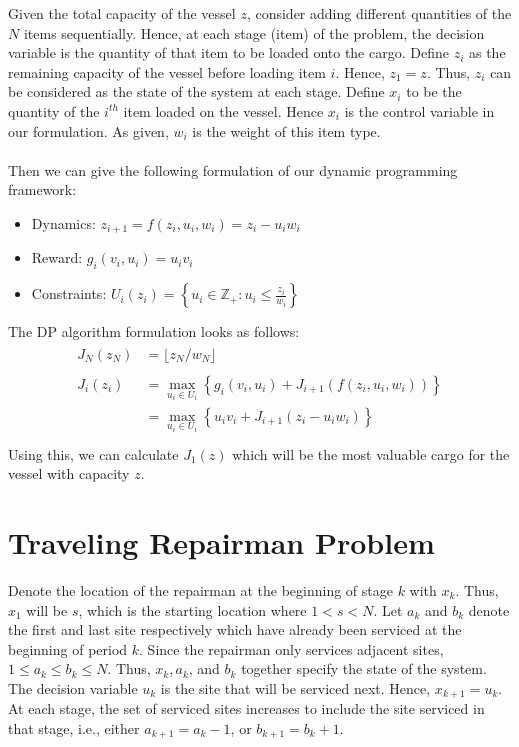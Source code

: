 \documentclass[11pt, oneside]{article}   	%
\begin{document}
Given the total capacity of the vessel $z$, consider adding different quantities of the $N$ items sequentially. Hence, at each stage (item) of the problem, the decision variable is the quantity of that item to be loaded onto the cargo. Define $z_i$ as the remaining capacity of the vessel before loading item $i$. Hence, $z_1 = z$. Thus, $z_i$ can be considered as the state of the system at each stage. Define $x_i$ to be the quantity of the $i^{th}$ item loaded on the vessel. Hence $x_i$ is the control variable in our formulation. As given, $w_i$ is the weight of this item type.\\\\
Then we can give the following formulation of our dynamic programming framework:
\begin{itemize}
\item Dynamics: $z_{i+1} = f(z_i,u_i,w_i) = z_i - u_i w_i$
\item Reward: $g_i(v_i, u_i) = u_i v_i$
\item Constraints: $U_i(z_i) = \left\{ u_i \in \mathbb{Z}_+ : u_i \leq \frac{z_i}{w_i} \right\}$
\end{itemize}
The DP algorithm formulation looks as follows:
\begin{align*}
\begin{split}
J_{N}(z_{N}) &= \lfloor{z_N/w_N}\rfloor
\\\\
J_i(z_i) &= \max_{u_i \in U_i} \left\{ g_i(v_i, u_i) + J_{i+1}(f(z_i, u_i, w_i)) \right\}\\
&= \max_{u_i \in U_i} \left\{ u_i v_i + J_{i+1}(z_i - u_i w_i) \right\}\\
\end{split}
\end{align*}
Using this, we can calculate $J_1(z)$ which will be the most valuable cargo for the vessel with capacity $z$.


\section{Traveling Repairman Problem}

Denote the location of the repairman at the beginning of stage $k$ with $x_k$. Thus, $x_1$ will be $s$, which is the starting location where $1 < s < N$. Let $a_k$ and $b_k$ denote the first and last site respectively which have already been serviced at the beginning of period $k$. Since the repairman only services adjacent sites, $1 \leq a_k \leq b_k \leq N$. Thus, $x_k, a_k$, and $b_k$ together specify the state of the system. The decision variable $u_k$ is the site that will be serviced next. Hence, $x_{k+1} = u_k$. At each stage, the set of serviced sites increases to include the site serviced in that stage, i.e., either $a_{k+1} = a_k -1$, or $b_{k+1} = b_k +1$.
\end{document}

